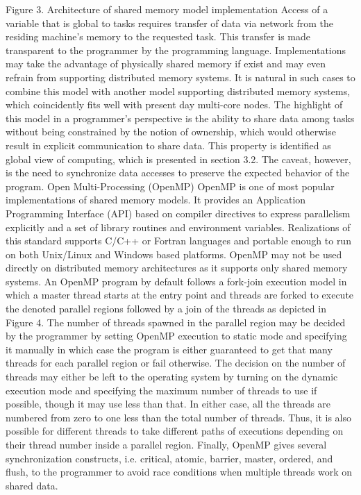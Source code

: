 Figure 3. Architecture of shared memory model implementation
Access of a variable that is global to tasks requires transfer of data via network from the residing machine’s memory to the requested task. This transfer is made transparent to the programmer by the programming language. Implementations may take the advantage of physically shared memory if exist and may even refrain from supporting distributed memory systems. It is natural in such cases to combine this model with another model supporting distributed memory systems, which coincidently fits well with present day multi-core nodes.
The highlight of this model in a programmer’s perspective is the ability to share data among tasks without being constrained by the notion of ownership, which would otherwise result in explicit communication to share data. This property is identified as global view of computing, which is presented in section 3.2. The caveat, however, is the need to synchronize data accesses to preserve the expected behavior of the program. 
Open Multi-Processing (OpenMP)
OpenMP is one of most popular implementations of shared memory models. It provides an Application Programming Interface (API) based on compiler directives to express parallelism explicitly and a set of library routines and environment variables. Realizations of this standard supports C/C++ or Fortran languages and portable enough to run on both Unix/Linux and Windows based platforms. OpenMP may not be used directly on distributed memory architectures as it supports only shared memory systems.
An OpenMP program by default follows a fork-join execution model in which a master thread starts at the entry point and threads are forked to execute the denoted parallel regions followed by a join of the threads as depicted in Figure 4.
The number of threads spawned in the parallel region may be decided by the programmer by setting OpenMP execution to static mode and specifying it manually in which case the program is either guaranteed to get that many threads for each parallel region or fail otherwise. The decision on the number of threads may either be left to the operating system by turning on the dynamic execution mode and specifying the maximum number of threads to use if possible, though it may use less than that. In either case, all the threads are numbered from zero to one less than the total number of threads. Thus, it is also possible for different threads to take different paths of executions depending on their thread number inside a parallel region. Finally, OpenMP gives several synchronization constructs, i.e. critical, atomic, barrier, master, ordered, and flush, to the programmer to avoid race conditions when multiple threads work on shared data.
